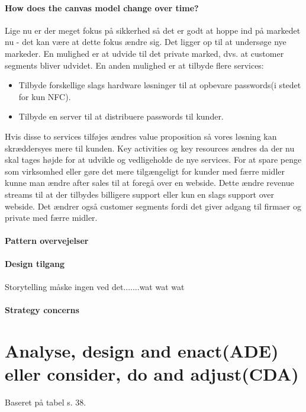\documentclass[a4paper]{article}
\begin{document}
\paragraph{How does the canvas model change over time?}
Lige nu er der meget fokus på sikkerhed så det er godt at hoppe ind på markedet nu - det kan være at dette fokus ændre sig.
Det ligger op til at undersøge nye markeder.
En mulighed er at udvide til det private marked, dvs. at customer segments bliver udvidet.
En anden mulighed er at tilbyde flere services:
\begin{itemize}
\item Tilbyde forskellige slags hardware løsninger til at opbevare passwords(i stedet for kun NFC).
\item Tilbyde en server til at distribuere passwords til kunder.
\end{itemize}
Hvis disse to services tilføjes ændres value proposition så vores løsning kan skræddersyes mere til kunden.
Key activities og key resources ændres da der nu skal tages højde for at udvikle og vedligeholde de nye services.
For at spare penge som virksomhed eller gøre det mere tilgængeligt for kunder med færre midler kunne man ændre after sales til at foregå over en webside.
Dette ændre revenue streams til at der tilbydes billigere support eller kun en slags support over webside.
Det ændrer også customer segments fordi det giver adgang til firmaer og private med færre midler.

\paragraph{Pattern overvejelser}

\paragraph{Design tilgang}
Storytelling måske ingen ved det.......wat wat wat

\paragraph{Strategy concerns}

\section{Analyse, design and enact(ADE) eller consider, do and adjust(CDA)}
Baseret på tabel s. 38.
\end{document}
